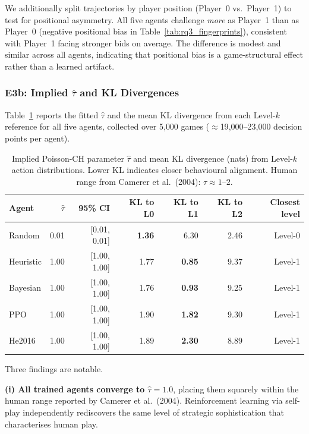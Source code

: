 \documentclass{article}
\begin{document}
We additionally split trajectories by player position (Player~0 vs.\ Player~1) to test for
positional asymmetry.  All five agents challenge \emph{more} as Player~1 than as Player~0
(negative positional bias in Table~\ref{tab:rq3_fingerprints}), consistent with Player~1 facing
stronger bids on average.  The difference is modest and similar across all agents, indicating
that positional bias is a game-structural effect rather than a learned artifact.

\subsubsection{E3b: Implied $\hat{\tau}$ and KL Divergences}

Table~\ref{tab:rq3_tau} reports the fitted $\hat{\tau}$ and the mean KL divergence from each
Level-$k$ reference for all five agents, collected over 5{,}000 games ($\approx$19{,}000--23{,}000
decision points per agent).

\begin{table}[h]
\centering
\caption{Implied Poisson-CH parameter $\hat{\tau}$ and mean KL divergence (nats) from
Level-$k$ action distributions.  Lower KL indicates closer behavioural alignment.
Human range from Camerer et al.\ (2004): $\tau \approx 1$--$2$.}
\label{tab:rq3_tau}
\begin{tabular}{lrrrrrr}
\toprule
Agent & $\hat{\tau}$ & 95\% CI & KL to L0 & KL to L1 & KL to L2 & Closest level \\
\midrule
Random    & 0.01 & [0.01, 0.01] & \textbf{1.36} & 6.30 & 2.46 & Level-0 \\
Heuristic & 1.00 & [1.00, 1.00] & 1.77 & \textbf{0.85} & 9.37 & Level-1 \\
Bayesian  & 1.00 & [1.00, 1.00] & 1.76 & \textbf{0.93} & 9.25 & Level-1 \\
PPO       & 1.00 & [1.00, 1.00] & 1.90 & \textbf{1.82} & 9.30 & Level-1 \\
He2016    & 1.00 & [1.00, 1.00] & 1.89 & \textbf{2.30} & 8.89 & Level-1 \\
\bottomrule
\end{tabular}
\end{table}

Three findings are notable.

\textbf{(i) All trained agents converge to $\hat{\tau} = 1.0$}, placing them squarely within
the human range reported by Camerer et al.\ (2004).  Reinforcement learning via self-play
independently rediscovers the same level of strategic sophistication that characterises
human play.
\end{document}
